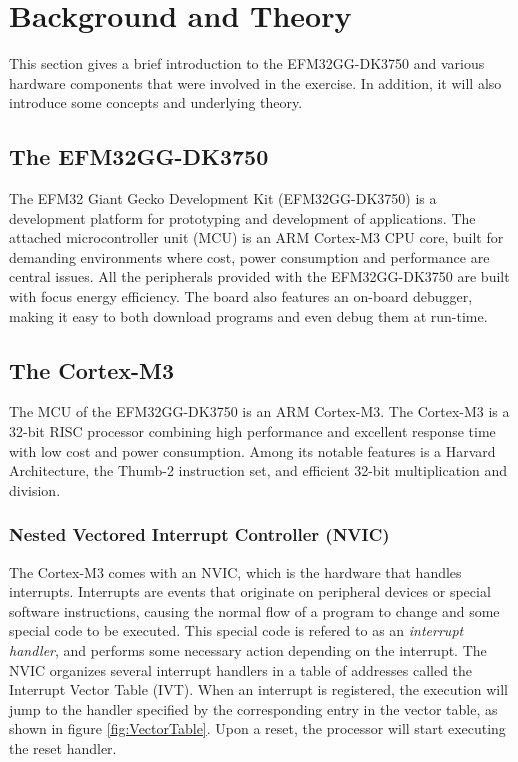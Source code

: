 
\chapter{Background and Theory}
This section gives a brief introduction to the EFM32GG-DK3750 and various hardware components that were involved in the exercise. In addition, it will also introduce some concepts and underlying theory.

\section{The EFM32GG-DK3750}
The EFM32 Giant Gecko Development Kit (EFM32GG-DK3750) is a development platform for prototyping and development of applications. The attached microcontroller unit (MCU) is an ARM Cortex-M3 CPU core, built for demanding environments where cost, power consumption and performance are central issues. All the peripherals provided with the EFM32GG-DK3750 are built with focus energy efficiency. The board also features an on-board debugger, making it easy to both download programs and even debug them at run-time.

\section{The Cortex-M3}
The MCU of the EFM32GG-DK3750 is an ARM Cortex-M3. The Cortex-M3 is a 32-bit RISC processor combining high performance and excellent response time with low cost and power consumption. Among its notable features is a Harvard Architecture, the Thumb-2 instruction set, and efficient 32-bit multiplication and division.


\subsection{Nested Vectored Interrupt Controller (NVIC)}
The Cortex-M3 comes with an NVIC, which is the hardware that handles interrupts. Interrupts are events that originate on peripheral devices or special software instructions, causing the normal flow of a program to change and some special code to be executed. This special code is refered to as an \emph{interrupt handler}, and performs some necessary action depending on the interrupt. The NVIC organizes several interrupt handlers in a table of addresses called the Interrupt Vector Table (IVT). When an interrupt is registered, the execution will jump to the handler specified by the corresponding entry in the vector table, as shown in figure \ref{fig:VectorTable}. Upon a reset, the processor will start executing the reset handler.

